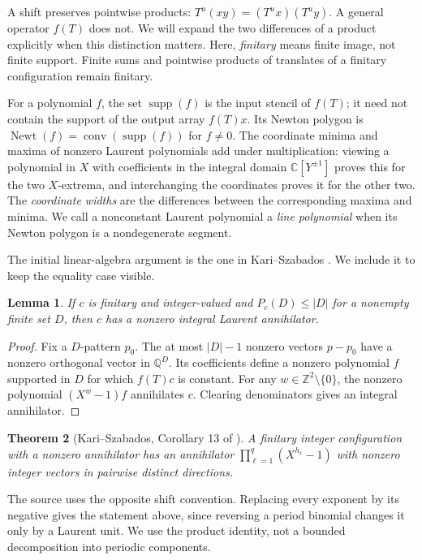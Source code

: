 \documentclass[11pt]{article}
\numberwithin{equation}{section}
\newtheorem{theorem}{Theorem}[section]
\newtheorem{lemma}[theorem]{Lemma}
\theoremstyle{definition}
\theoremstyle{remark}
\newcommand{\Z}{\mathbb Z}
\newcommand{\C}{\mathbb C}
\newcommand{\Q}{\mathbb Q}
\newcommand{\supp}{\operatorname{supp}}
\newcommand{\Newt}{\operatorname{Newt}}
\newcommand{\conv}{\operatorname{conv}}
\begin{document}
A shift preserves pointwise products: $T^u(xy)=(T^u x)(T^u y)$. A general operator $f(T)$ does
not. We will expand the two differences of a product explicitly when this distinction matters.
Here, \emph{finitary} means finite image, not finite support. Finite sums and pointwise products
of translates of a finitary configuration remain finitary.

For a polynomial $f$, the set $\supp(f)$ is the input stencil of $f(T)$; it need not contain the
support of the output array $f(T)x$. Its Newton polygon is
$\Newt(f)=\conv(\supp(f))$ for $f\ne0$. The coordinate minima and maxima of nonzero Laurent
polynomials add under multiplication: viewing a
polynomial in $X$ with coefficients in the integral domain $\C[Y^{\pm1}]$ proves this for the two
$X$-extrema, and interchanging the coordinates proves it for the other two. The \emph{coordinate
widths} are the differences between the corresponding maxima and minima. We call a nonconstant
Laurent polynomial a \emph{line polynomial} when its Newton polygon is a nondegenerate segment.

The initial linear-algebra argument is the one in Kari--Szabados \cite[Lemma~5]{KS}. We include it
to keep the equality case visible.

\begin{lemma}\label{lem:affine-ann}
If $c$ is finitary and integer-valued and $P_c(D)\le |D|$ for a nonempty finite set $D$, then $c$
has a nonzero integral Laurent annihilator.
\end{lemma}
\begin{proof}
Fix a $D$-pattern $p_0$. The at most $|D|-1$ nonzero vectors $p-p_0$ have a nonzero orthogonal
vector in $\Q^D$. Its coefficients define a nonzero polynomial $f$ supported in $D$ for which
$f(T)c$ is constant. For any $w\in\Z^2\setminus\{0\}$, the nonzero polynomial $(X^w-1)f$ annihilates
$c$. Clearing denominators gives an integral annihilator.
\end{proof}

\begin{theorem}[Kari--Szabados, Corollary 13 of \cite{KS}]\label{thm:KS}
A finitary integer configuration with a nonzero annihilator has an annihilator
$\prod_{\ell=1}^q(X^{h_\ell}-1)$ with nonzero integer vectors in pairwise distinct directions.
\end{theorem}
The source uses the opposite shift convention. Replacing every exponent by its negative gives the
statement above, since reversing a period binomial changes it only by a Laurent unit. We use the
product identity, not a bounded decomposition into periodic components.
\end{document}

